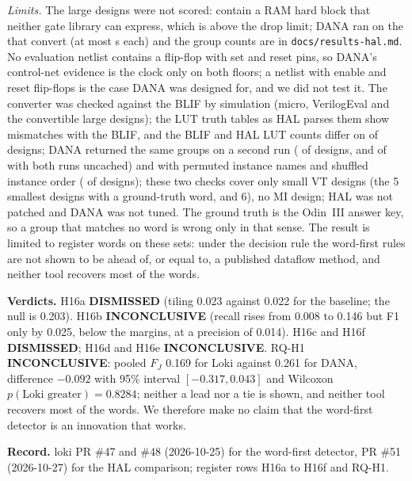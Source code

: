 \documentclass[conference]{IEEEtran}
\newcommand{\verdict}[1]{\textbf{\textsc{#1}}}
\newcommand{\hev}[1]{\par\smallskip\noindent\textbf{#1}}
\newcommand{\code}[1]{\texttt{#1}}
\begin{document}
\emph{Limits.} The \halBigTotal{} large designs were not scored: \halBigDropped{} contain a RAM hard
block that neither gate library can express, which is above the \halStopLimit{} drop
limit; DANA ran on the \halBigRun{} that convert (at most \halBigMaxSeconds{} s each) and the group
counts are in \code{docs/results-hal.md}. No evaluation netlist contains a flip-flop with set and
reset pins, so DANA's control-net evidence is the clock only on both floors; a netlist with enable
and reset flip-flops is the case DANA was designed for, and we did not test it. The converter was
checked against the BLIF by simulation (micro, VerilogEval and the convertible large designs); the
\halLutCount{} LUT truth tables as HAL parses them show \halLutMismatch{} mismatches with the
BLIF, and the BLIF and HAL LUT counts differ on \halLutCountBad{} of \halLutDesigns{} designs;
DANA returned the same groups on a second run (\halRepIdentical{} of \halRepDesigns{} designs,
and \halFreshIdentical{} of \halFreshDesigns{} with both runs uncached) and with permuted instance
names and shuffled instance order (\halPermIdentical{} of \halPermDesigns{} designs); these two
checks cover only small VT designs (the 5 smallest designs with a ground-truth word, and 6), no MI
design; HAL was not patched and DANA was not tuned. The ground truth is the
Odin~III answer key, so a group that matches no word is wrong only in that sense. The
result is limited to register words on these sets: under the decision rule the word-first
rules are not shown to be ahead of, or equal to, a published dataflow method, and neither tool
recovers most of the words.




\hev{Verdicts.} H16a \verdict{DISMISSED} (tiling 0.023 against 0.022 for the baseline; the null is 0.203). H16b
\verdict{INCONCLUSIVE} (recall rises from 0.008 to 0.146 but F1 only by 0.025, below the margins, at a precision of 0.014).
H16c and H16f \verdict{DISMISSED}; H16d and H16e \verdict{INCONCLUSIVE}. RQ-H1 \verdict{INCONCLUSIVE}: pooled $F_J$ 0.169 for
Loki against 0.261 for DANA, difference $-0.092$ with 95\% interval $[-0.317, 0.043]$ and Wilcoxon $p(\text{Loki greater})=0.8284$;
neither a lead nor a tie is shown, and neither tool recovers most of the words. We therefore make no claim that the word-first
detector is an innovation that works.


\hev{Record.} loki PR \#47 and \#48 (2026-10-25) for the word-first detector, PR \#51 (2026-10-27) for the HAL comparison; register rows H16a to H16f and RQ-H1.
\end{document}

